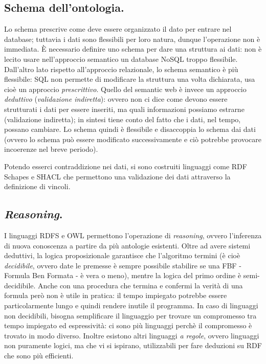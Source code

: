 \documentclass[11pt]{article}
\begin{document}
\subsection{Schema dell'ontologia.}
Lo schema prescrive come deve essere organizzato il dato per entrare nel database; tuttavia i dati sono flessibili per loro natura, dunque l'operazione non è immediata.
È necessario definire uno schema per dare una struttura ai dati: non è lecito usare nell'approccio semantico un database NoSQL troppo flessibile.
Dall'altro lato rispetto all'approccio relazionale, lo schema semantico è più flessibile: SQL non permette di modificare la struttura una volta dichiarata, usa cioè un approccio \textit{prescrittivo}.
Quello del semantic web è invece un approccio \textit{deduttivo} (\textit{validazione indiretta}): ovvero non ci dice come devono essere strutturati i dati per essere inseriti, ma quali informazioni possiamo estrarne (validazione indiretta); in sintesi tiene conto del fatto che i dati, nel tempo, possano cambiare.
Lo schema quindi è flessibile e disaccoppia lo schema dai dati (ovvero lo schema può essere modificato successivamente e ciò potrebbe provocare incoerenze nel breve periodo).

Potendo esserci contraddizione nei dati, si sono costruiti linguaggi come RDF Schapes e SHACL che permettono una validazione dei dati attraverso la definizione di vincoli.

\subsection{\textit{Reasoning}.}
I linguaggi RDFS e OWL permettono l'operazione di \textit{reasoning}, ovvero l'inferenza di nuova conoscenza a partire da più antologie esistenti.
Oltre ad avere sistemi deduttivi, la logica proposizionale garantisce che l'algoritmo termini (è cioè \textit{decidibile}, ovvero date le premesse è sempre possibile stabilire se una FBF - Formula Ben Formata - è vera o meno), mentre la logica del primo ordine è semi-decidibile.
Anche con una procedura che termina e confermi la verità di una formula però non è utile in pratica: il tempo impiegato potrebbe essere particolarmente lungo e quindi rendere inutile il programma.
In caso di linguaggi non decidibili, bisogna semplificare il linguaggio per trovare un compromesso tra tempo impiegato ed espressività: ci sono più linguaggi perchè il compromesso è trovato in modo diverso.
Inoltre esistono altri linguaggi \textit{a regole}, ovvero linguaggi non puramente logici, ma che vi si ispirano, utilizzabili per fare deduzioni su RDF che sono più efficienti.
\end{document}
